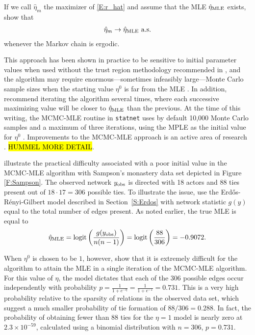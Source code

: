 If we call $\hat{\eta}_m$  the maximizer of \eqref{E:r_hat} and assume that the MLE 
$\hat{\eta}_{\textrm{MLE}}$ exists, \citeauthor{Geyer:1992} show that 
\begin{align*}
	\hat{\eta}_m \to \hat{\eta}_{\textrm{MLE}} \text{ a.s.}
\end{align*}
 whenever the Markov chain is ergodic. 
 
This approach has been shown in practice to be sensitive to initial parameter 
values when used without the trust region methodology recommended in \citep{Geyer:1992}, 
and the algorithm may require enormous---sometimes infeasibly large---Monte Carlo sample sizes 
when the starting value $\eta^0$ is far from the MLE \citep{ergm}.  
In addition, \citeauthor{Geyer:1992} recommend iterating the algorithm several times, 
where each successive maximizing value will be closer to $\hat{\eta}_{\textrm{MLE}}$ than the previous.  At the 
time of this writing, the MCMC-MLE routine in \texttt{statnet} uses by default 10,000 
Monte Carlo samples and a maximum of three iterations, using the 
MPLE as the initial value for $\eta^0$ \citep{statnet:R}.  
Improvements to the MCMC-MLE approach is an active area of research \citep*{Bartz,Hummel}.  \hl{HUMMEL MORE DETAIL}.

\citet{ergm} illustrate the practical difficulty associated with a poor initial 
value in the MCMC-MLE algorithm with Sampson's monastery data set depicted in 
Figure \ref{F:Sampson}.  The 
observed network $y_{\text{obs}}$ is directed with 18 actors and 88 ties present out of $18 \cdot 17=306$ possible 
ties.  To illustrate the issue, \citeauthor{ergm} use the Erd\H{o}s-R\'{e}nyi-Gilbert model 
described in Section~\ref{S:Erdos} with network statistic $g(y)$ equal to the total number of 
edges present.  As noted earlier, the true MLE is equal to 
\begin{align*}
	\hat{\eta}_{\textrm{MLE}} = \operatorname{logit}\left( \frac{g(y_{\text{obs}})}{n(n-1)}\right) = \operatorname{logit} \left( \frac{88}{306}\right ) = -0.9072.
\end{align*}
  
When $\eta^0$ is chosen to be $1$, however, \citeauthor{ergm} show that it is
extremely difficult for the algorithm to attain the MLE in a single iteration of 
the MCMC-MLE algorithm.  
For this value of $\eta$, the model dictates that each of the 306 possible edges occur independently with probability $p = \frac{1}{1+e^{-\eta}} = \frac{1}{1+e^{-1}} = 0.731$.   
This is a very high probability relative to the sparsity of relations in the observed data 
set, which suggest a much smaller probability of tie formation of $88/306= 0.288$.  
In fact, the probability of obtaining fewer than 88 ties for the $\eta=1$ model is nearly zero at $2.3 \times 10^{-59}$, calculated using a binomial distribution with $n=306$, $p =0.731$.  

